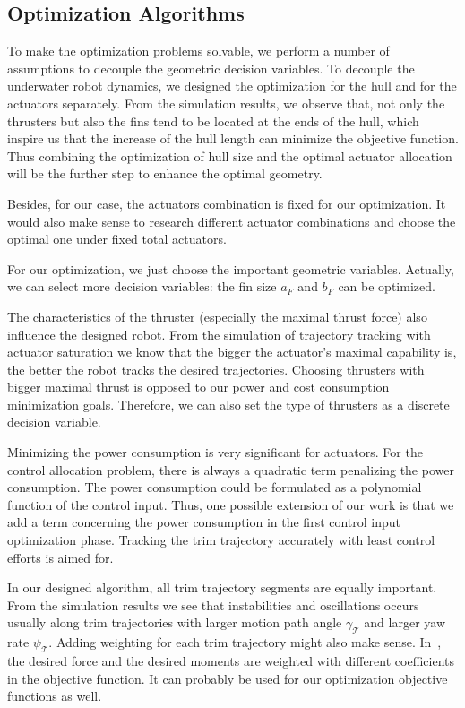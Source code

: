 \subsection{Optimization Algorithms}
To make the optimization problems solvable, we perform a number of assumptions to decouple the geometric decision variables. To decouple the underwater robot dynamics, we designed the optimization for the hull and for the actuators separately. From the simulation results, we observe that, not only the thrusters but also the fins tend to be located at the ends of the hull, which inspire us that the increase of the hull length can minimize the objective function. Thus combining the optimization of hull size and the optimal actuator allocation will be the further step to enhance the optimal geometry.

Besides, for our case, the actuators combination is fixed for our optimization.
It would also make sense to research different actuator combinations and choose the optimal one under fixed total actuators.

For our optimization, we just choose the important geometric variables. Actually, we can select more decision variables: the fin size $a_{F}$ and $b_{F}$ can be optimized. 

The characteristics of the thruster (especially the maximal thrust force) also influence the designed robot. From the simulation of trajectory tracking with actuator saturation we know that the bigger the actuator's maximal capability is, the better the robot tracks the desired trajectories. Choosing thrusters with bigger maximal thrust is opposed to our power and cost consumption minimization goals. Therefore, we can also set the type of thrusters as a discrete decision variable.

Minimizing the power consumption is very significant for actuators. For the control allocation problem, there is always a quadratic term penalizing the power consumption. The power consumption could be formulated as a polynomial function of the control input. Thus, one possible extension of our work is that we add a term concerning the power consumption in the first control input optimization phase. Tracking the trim trajectory accurately with least control efforts is aimed for.

In our designed algorithm, all trim trajectory segments are equally important. From the simulation results we see that instabilities and oscillations occurs usually along trim trajectories with larger motion path angle $\gamma_{\mathcal{T}}$ and larger yaw rate $\psi_{\mathcal{T}}$. Adding weighting for each trim trajectory might also make sense. In~\cite{Du2016}, the desired force and the desired moments are weighted with different coefficients in the objective function. It can probably be used for our optimization objective functions as well.


